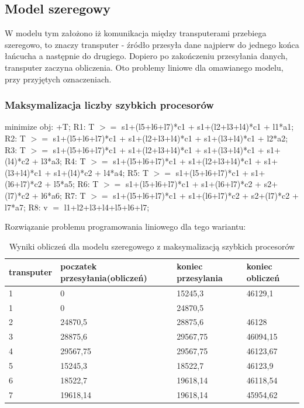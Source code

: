\documentclass[a4paper,11pt, titlepage]{article}
\begin{document}
\subsection{Model szeregowy}
W modelu tym założono iż komunikacja między transputerami przebiega szeregowo,  to znaczy transputer - źródło przesyła dane najpierw do jednego końca łańcucha a następnie do drugiego. Dopiero po zakończeniu przesyłania danych, transputer zaczyna obliczenia. Oto problemy liniowe dla omawianego modelu, przy przyjętych oznaczeniach.

\subsubsection{Maksymalizacja liczby szybkich procesorów}
\begin{flushleft}

minimize obj: +T;\linebreak
\linebreak
R1: T $>=$ s1+(l5+l6+l7)*c1 + s1+(l2+l3+l4)*c1 + l1*a1;\linebreak
R2: T $>=$ s1+(l5+l6+l7)*c1 + s1+(l2+l3+l4)*c1 + s1+(l3+l4)*c1 + l2*a2;\linebreak
R3: T $>=$ s1+(l5+l6+l7)*c1 + s1+(l2+l3+l4)*c1 + s1+(l3+l4)*c1 + s1+(l4)*c2 + l3*a3;\linebreak
R4: T $>=$ s1+(l5+l6+l7)*c1 + s1+(l2+l3+l4)*c1 + s1+(l3+l4)*c1 + s1+(l4)*c2 + l4*a4;\linebreak
R5: T $>=$ s1+(l5+l6+l7)*c1 + s1+(l6+l7)*c2 + l5*a5;\linebreak
R6: T $>=$ s1+(l5+l6+l7)*c1 + s1+(l6+l7)*c2 + s2+(l7)*c2 + l6*a6;\linebreak
R7: T $>=$ s1+(l5+l6+l7)*c1 + s1+(l6+l7)*c2 + s2+(l7)*c2 + l7*a7;\linebreak
R8: v $=$ l1+l2+l3+l4+l5+l6+l7;\linebreak
\end{flushleft}

Rozwiązanie problemu programowania liniowego dla tego wariantu:
\begin{table}[hp!]
\begin{tabular}{|l|l|l|l|}\hline
transputer & poczatek przesyłania(obliczeń) & koniec przesylania & koniec obliczeń\\ \hline
1	&0			&15245,3	&46129,1\\	\hline
1	&0			&24870,5	&\\	\hline
2	&24870,5	&28875,6	&46128\\	\hline
3	&28875,6 	&29567,75	&46094,15\\	\hline
4	&29567,75	&29567,75	&46123,67\\	\hline
5	&15245,3	&18522,7	&46123,9\\	\hline
6	&18522,7	&19618,14	&46118,54\\	\hline
7	&19618,14	&19618,14	&45954,62\\	\hline
\end{tabular}
\caption{Wyniki obliczeń dla modelu szeregowego z maksymalizacją szybkich procesorów \label{szeregowe_pt}}
\end{table}
\end{document}
